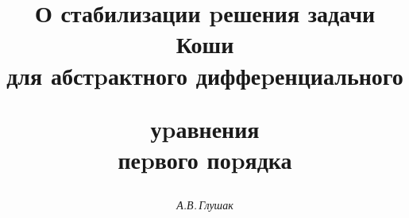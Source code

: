 









\newcommand{\cth}{\operatorname{cth}}


\newcommand{\sh}{\operatorname{sh}}


\newcommand{\ch}{\operatorname{ch}}


\newcommand{\tts}[1]{}







\setcounter{page}{3}















\author{\it А.В.\,Глушак}




\title{О стабилизации pешения задачи Коши\\ для абстpактного диффеpенциального


уpавнения\\ пеpвого поpядка}





\date{}




\pagestyle{plain} %







\maketitle


